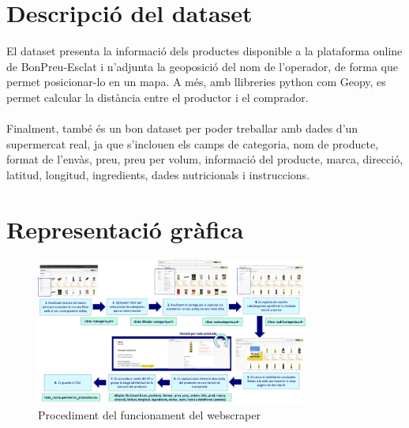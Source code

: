 \documentclass[]{scrartcl}
\begin{document}
\section{Descripció del dataset}
El dataset presenta la informació dels productes disponible a la plataforma online de BonPreu-Esclat i n'adjunta la geoposició del nom de l'operador, de forma que permet posicionar-lo en un mapa.
A més, amb llibreries python com Geopy, es permet calcular la distància entre el productor i el comprador.
\\\\Finalment, també és un bon dataset per poder treballar amb dades d'un supermercat real, ja que s'inclouen els camps de categoria, nom de producte, format de l'envàs, preu, preu per volum, informació del producte, marca, direcció, latitud, longitud, ingredients, dades nutricionals i instruccions.

\section{Representació gràfica}

\begin{figure}[htb]
	\centering
	\includegraphics[width=0.8\textwidth]{Procediment}
	\caption{Procediment del funcionament del webscraper}
\end{figure}
\end{document}
